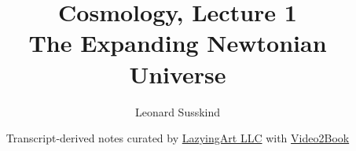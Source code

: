 \documentclass[11pt,oneside]{book}
\begin{document}
\hypersetup{pageanchor=false}
\frontmatter
\title{Cosmology, Lecture 1\\The Expanding Newtonian Universe}
\author{Leonard Susskind}
\date{Transcript-derived notes curated by \href{https://lazying.art}{LazyingArt LLC} with \href{https://github.com/lachlanchen/Video2Book}{Video2Book}}
\maketitle
\hypersetup{pageanchor=true}
\mainmatter

\end{document}
